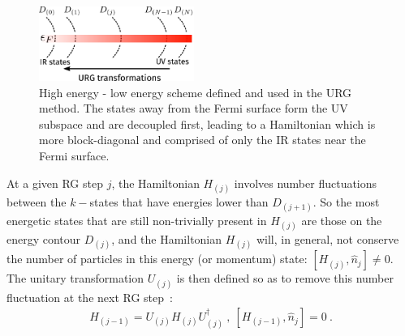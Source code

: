 \documentclass[reprint,superscriptaddress,floatfix]{revtex4-2}
\begin{document}
\begin{figure}[htpb]
	\centering
	\includegraphics[width=0.45\textwidth]{../figures/urg-scheme.pdf}
	\caption{High energy - low energy scheme defined and used in the URG method. The states away from the Fermi surface form the UV subspace and are decoupled first, leading to a Hamiltonian which is more block-diagonal and comprised of only the IR states near the Fermi surface.}
	\label{urg-scheme}
\end{figure}

At a given RG step \(j\), the Hamiltonian \(H_{(j)}\) involves number fluctuations between the \(k-\)states that have energies lower than \(D_{(j+1)}\). So the most energetic states that are still non-trivially present in \(H_{(j)}\) are those on the energy contour \(D_{(j)}\), and the Hamiltonian \(H_{(j)}\) will, in general, not conserve the number of particles in this energy (or momentum) state: \(\left[H_{(j)}, \hat n_{j}\right] \neq 0\). The unitary transformation \(U_{(j)}\) is then defined so as to remove this number fluctuation at the next RG step~\cite{anirbanurg1,anirbanurg2}:
\begin{equation}\begin{aligned}
	H_{(j-1)} = U_{(j)} H_{(j)} U^\dagger_{(j)}~, ~\left[H_{(j-1)}, \hat n_{j}\right] =0~.
\end{aligned}\end{equation}
\end{document}
